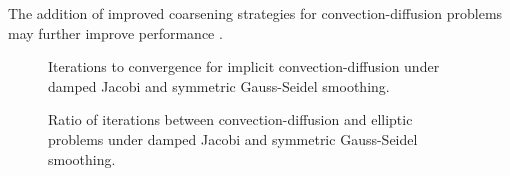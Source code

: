 \documentclass[final,leqno]{siamltex}
\begin{document}
The addition of improved coarsening strategies for convection-diffusion problems may further improve performance \cite{notay2012aggregation}.
\begin{figure}
\caption{Iterations to convergence for implicit convection-diffusion under damped Jacobi and symmetric Gauss-Seidel smoothing.}
\label{fig:agmg_res}
\end{figure}

\begin{figure}
\caption{Ratio of iterations between convection-diffusion and elliptic problems under damped Jacobi and symmetric Gauss-Seidel smoothing.}
\label{fig:agmg_ratio}
\end{figure}
\end{document}
